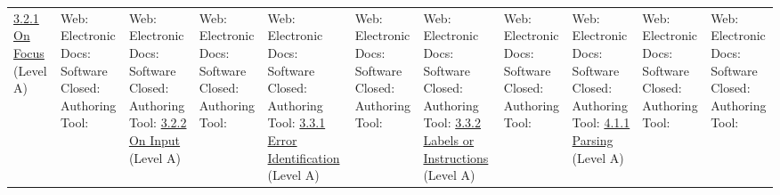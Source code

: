 \documentclass[a4paper]{report}
\begin{document}
\begin{longtable}{|l|l|l|}
 	\hline
 	\href{http://www.w3.org/TR/WCAG20/#consistent-behavior-receive-focus}{3.2.1 On Focus} (Level A) & \makecell{Web: \\ Electronic Docs: \\ Software \\ Closed: \\ Authoring Tool:} & \makecell{Web: \\ Electronic Docs: \\ Software \\ Closed: \\ Authoring Tool:}
 	\hline
 	\href{http://www.w3.org/TR/WCAG20/#consistent-behavior-unpredictable-change}{3.2.2 On Input} (Level A) & \makecell{Web: \\ Electronic Docs: \\ Software \\ Closed: \\ Authoring Tool:} & \makecell{Web: \\ Electronic Docs: \\ Software \\ Closed: \\ Authoring Tool:}
 	\hline
 	\href{http://www.w3.org/TR/WCAG20/#minimize-error-identified}{3.3.1 Error Identification} (Level A) & \makecell{Web: \\ Electronic Docs: \\ Software \\ Closed: \\ Authoring Tool:} & \makecell{Web: \\ Electronic Docs: \\ Software \\ Closed: \\ Authoring Tool:}
 	\hline
 	\href{http://www.w3.org/TR/WCAG20/#minimize-error-cues}{3.3.2 Labels or Instructions} (Level A) & \makecell{Web: \\ Electronic Docs: \\ Software \\ Closed: \\ Authoring Tool:} & \makecell{Web: \\ Electronic Docs: \\ Software \\ Closed: \\ Authoring Tool:}
 	\hline
 	\href{http://www.w3.org/TR/WCAG20/#ensure-compat-parses}{4.1.1 Parsing} (Level A) & \makecell{Web: \\ Electronic Docs: \\ Software \\ Closed: \\ Authoring Tool:} & \makecell{Web: \\ Electronic Docs: \\ Software \\ Closed: \\ Authoring Tool:}

\end{longtable}
\end{document}
